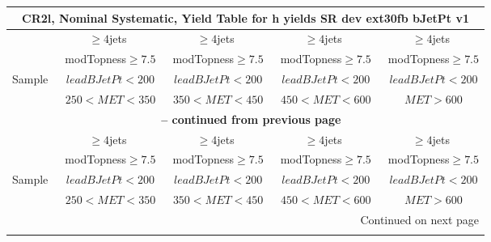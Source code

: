 \documentclass{article}
\begin{document}
 
 
\begin{longtable}{|l|c|c|c|c|} 
 
\multicolumn{5}{c}{ CR2l, Nominal Systematic, Yield Table for h yields SR dev ext30fb bJetPt v1 }\\* \hline 
  & $\ge4$jets  & $\ge4$jets  & $\ge4$jets  & $\ge4$jets \\* 
  & ~modTopness$\ge7.5$  & ~modTopness$\ge7.5$  & ~modTopness$\ge7.5$  & ~modTopness$\ge7.5$ \\* 
Sample  & ~$leadBJetPt<200$  & ~$leadBJetPt<200$  & ~$leadBJetPt<200$  & ~$leadBJetPt<200$ \\* 
  & ~$250<MET<350$  & ~$350<MET<450$  & ~$450<MET<600$  & ~$MET>600$ \\* 
\hline \hline 
\endfirsthead 
 
\multicolumn{5}{c}{{\bfseries \tablename\ \thetable{} -- continued from previous page}}\\* \hline 
  & $\ge4$jets  & $\ge4$jets  & $\ge4$jets  & $\ge4$jets \\* 
  & ~modTopness$\ge7.5$  & ~modTopness$\ge7.5$  & ~modTopness$\ge7.5$  & ~modTopness$\ge7.5$ \\* 
Sample  & ~$leadBJetPt<200$  & ~$leadBJetPt<200$  & ~$leadBJetPt<200$  & ~$leadBJetPt<200$ \\* 
  & ~$250<MET<350$  & ~$350<MET<450$  & ~$450<MET<600$  & ~$MET>600$ \\* 
\hline \hline 
\endhead 
 
\multicolumn{5}{|r|}{{Continued on next page}}\\* \hline 
\endfoot 
 
 
\endlastfoot 
 

\end{longtable}
\end{document}
